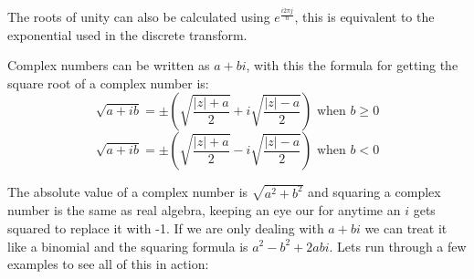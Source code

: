 \documentclass[12pt]{article}
\begin{document}
The roots of unity can also be calculated using $e^\frac{i2\pi j}{n}$, this is equivalent to the exponential used in the discrete transform.

\pagebreak

Complex numbers can be written as $a + bi$, with this the formula for getting the square root of a complex number is:
\begin{displaymath}
  \sqrt{a+ib} = \pm\left(\sqrt{\frac{|z| + a}{2}} + i\sqrt{\frac{|z| - a}{2}}\right) \text{ when } b \ge 0
\end{displaymath}
\begin{displaymath}
  \sqrt{a+ib} = \pm\left(\sqrt{\frac{|z| + a}{2}} - i\sqrt{\frac{|z| - a}{2}}\right) \text{ when } b < 0
\end{displaymath}

The absolute value of a complex number is $\sqrt{a^2+b^2}$ and squaring a complex number is the same as real algebra, keeping an eye our for anytime an $i$ gets squared to replace it with -1. If we are only dealing with $a + bi$ we can treat it like a binomial and the squaring formula is $a^2 - b^2 + 2abi$. Lets run through a few examples to see all of this in action:
\end{document}
